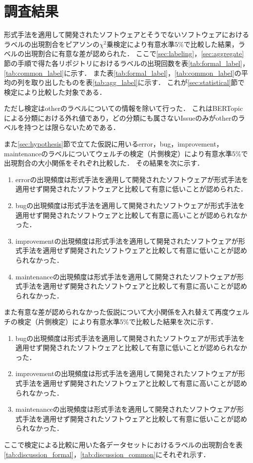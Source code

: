 \documentclass[main]{subfiles}
\begin{document}
\chapter{調査結果}

形式手法を適用して開発されたソフトウェアとそうでないソフトウェアにおけるラベルの出現割合をピアソンの\(\chi^2\)乗検定により有意水準5\%で比較した結果，ラベルの出現割合に有意な差が認められた．
ここで\ref{sec:labeling}，\ref{sec:aggregate}節の手順で得た各リポジトリにおけるラベルの出現回数を表\ref{tab:formal_label}，\ref{tab:common_label}に示す．
また表\ref{tab:formal_label}，\ref{tab:common_label}の平均の列を取り出したものを表\ref{tab:agg_label}に示す．
これが\ref{sec:statistical}節で検定により比較した対象である．

ただし検定はotherのラベルについての情報を除いて行った．
これはBERTopicによる分類における外れ値であり，どの分類にも属さないIssueのみがotherのラベルを持つとは限らないためである．



また\ref{sec:hypothesis}節で立てた仮説に用いるerror，bug，improvement，maintenanceのラベルについてウェルチの検定（片側検定）により有意水準5\%で出現割合の大小関係をそれぞれ比較した．
その結果を次に示す．

\begin{enumerate}
	\item errorの出現頻度は形式手法を適用して開発されたソフトウェアが形式手法を適用せず開発されたソフトウェアと比較して有意に低いことが認められた．
	\item bugの出現頻度は形式手法を適用して開発されたソフトウェアが形式手法を適用せず開発されたソフトウェアと比較して有意に高いことが認められなかった．
	\item improvementの出現頻度は形式手法を適用して開発されたソフトウェアが形式手法を適用せず開発されたソフトウェアと比較して有意に低いことが認められなかった．
	\item maintenanceの出現頻度は形式手法を適用して開発されたソフトウェアが形式手法を適用せず開発されたソフトウェアと比較して有意に高いことが認められなかった．
\end{enumerate}

また有意な差が認められなかった仮説について大小関係を入れ替えて再度ウェルチの検定（片側検定）により有意水準5\%で比較した結果を次に示す．

\begin{enumerate}
	\item bugの出現頻度は形式手法を適用して開発されたソフトウェアが形式手法を適用せず開発されたソフトウェアと比較して有意に低いことが認められなかった．
	\item improvementの出現頻度は形式手法を適用して開発されたソフトウェアが形式手法を適用せず開発されたソフトウェアと比較して有意に高いことが認められなかった．
	\item maintenanceの出現頻度は形式手法を適用して開発されたソフトウェアが形式手法を適用せず開発されたソフトウェアと比較して有意に低いことが認められなかった．
\end{enumerate}

ここで検定による比較に用いた各データセットにおけるラベルの出現割合を表\ref{tab:discussion_formal}，\ref{tab:discussion_common}にそれぞれ示す．


\end{document}
